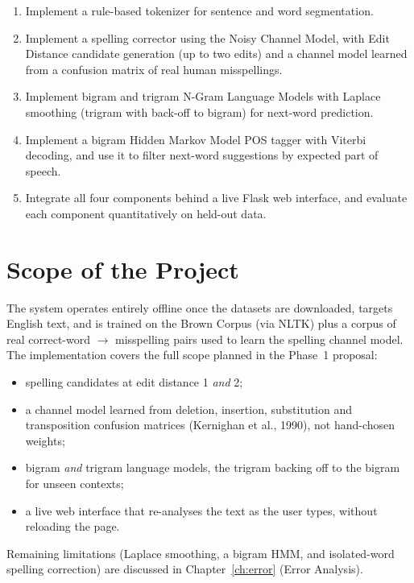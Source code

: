 \documentclass[12pt,a4paper]{report}
\begin{document}
\begin{enumerate}
    \item Implement a rule-based tokenizer for sentence and word
    segmentation.
    \item Implement a spelling corrector using the Noisy Channel Model,
    with Edit Distance candidate generation (up to two edits) and a
    channel model learned from a confusion matrix of real human
    misspellings.
    \item Implement bigram and trigram N-Gram Language Models with Laplace
    smoothing (trigram with back-off to bigram) for next-word prediction.
    \item Implement a bigram Hidden Markov Model POS tagger with Viterbi
    decoding, and use it to filter next-word suggestions by expected
    part of speech.
    \item Integrate all four components behind a live Flask web interface,
    and evaluate each component quantitatively on held-out data.
\end{enumerate}

\section{Scope of the Project}

The system operates entirely offline once the datasets are downloaded,
targets English text, and is trained on the Brown Corpus (via NLTK) plus
a corpus of real correct-word $\rightarrow$ misspelling pairs used to
learn the spelling channel model. The implementation covers the full
scope planned in the Phase~1 proposal:
\begin{itemize}
    \item spelling candidates at edit distance 1 \emph{and} 2;
    \item a channel model learned from deletion, insertion, substitution
    and transposition confusion matrices (Kernighan et al., 1990), not
    hand-chosen weights;
    \item bigram \emph{and} trigram language models, the trigram backing
    off to the bigram for unseen contexts;
    \item a live web interface that re-analyses the text as the user
    types, without reloading the page.
\end{itemize}
Remaining limitations (Laplace smoothing, a bigram HMM, and
isolated-word spelling correction) are discussed in
Chapter~\ref{ch:error} (Error Analysis).

\end{document}
